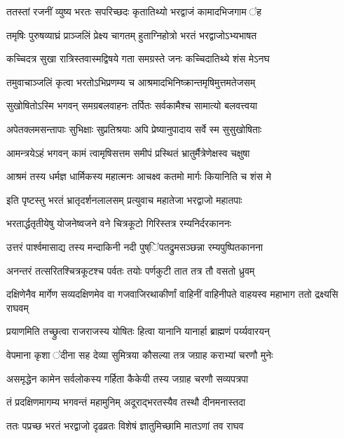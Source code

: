 
\twolineshloka
{ततस्तां रजनीं व्युष्य भरतः सपरिच्छदः}
{कृतातिथ्यो भरद्वाजं कामादभिजगाम ऺह} %

\twolineshloka
{तमृषिः पुरुषव्याघ्रं प्राञ्जलिं प्रेक्ष्य चागतम्}
{हुताग्निहोत्रो भरतं भरद्वाजोऽभ्यभाषत} %

\twolineshloka
{कच्चिदत्र सुखा रात्रिस्तवास्मद्विषये गता}
{समग्रस्ते जनः कच्चिदातिथ्ये शंस मेऽनघ} %

\twolineshloka
{तमुवाचाञ्जलिं कृत्वा भरतोऽभिप्रणम्य च}
{आश्रमादभिनिष्क्रान्तमृषिमुत्तमतेजसम्} %

\twolineshloka
{सुखोषितोऽस्मि भगवन् समग्रबलवाहनः}
{तर्पितः सर्वकामैश्च सामात्यो बलवत्त्वया} %

\twolineshloka
{अपेतक्लमसन्तापाः सुभिक्षाः सुप्रतिश्रयाः}
{अपि प्रेष्यानुपादाय सर्वे स्म सुसुखोषिताः} %

\twolineshloka
{आमन्त्रयेऽहं भगवन् कामं त्वामृषिसत्तम}
{समीपं प्रस्थितं भ्रातुर्मैत्रेणेक्षस्व चक्षुषा} %

\twolineshloka
{आश्रमं तस्य धर्मज्ञ धार्मिकस्य महात्मनः}
{आचक्ष्व कतमो मार्गः कियानिति च शंस मे} %

\twolineshloka
{इति पृष्टस्तु भरतं भ्रातृदर्शनलालसम्}
{प्रत्युवाच महातेजा भरद्वाजो महातपाः} %

\twolineshloka
{भरतार्द्धतृतीयेषु योजनेष्वजने वने}
{चित्रकूटो गिरिस्तत्र रम्यनिर्दरकाननः} %

\twolineshloka
{उत्तरं पार्श्वमासाद्य तस्य मन्दाकिनी नदी}
{पुष्ऺिपतद्रुमसञ्छन्ना रम्यपुष्पितकानना} %

\twolineshloka
{अनन्तरं तत्सरितश्चित्रकूटश्च पर्वतः}
{तयोः पर्णकुटी तात तत्र तौ वसतो ध्रुवम्} %

\threelineshloka
{दक्षिणेनैव मार्गेण सव्यदक्षिणमेव वा}
{गजवाजिरथाकीर्णां वाहिनीं वाहिनीपते}
{वाहयस्व महाभाग ततो द्रक्ष्यसि राघवम्} %

\twolineshloka
{प्रयाणमिति तच्छ्रुत्वा राजराजस्य योषितः}
{हित्वा यानानि यानार्हा ब्राह्मणं पर्य्यवारयन्} %

\twolineshloka
{वेपमाना कृशा ऺदीना सह देव्या सुमित्रया}
{कौसल्या तत्र जग्राह कराभ्यां चरणौ मुनेः} %

\twolineshloka
{असमृद्धेन कामेन सर्वलोकस्य गर्हिता}
{कैकेयी तस्य जग्राह चरणौ सव्यपत्रपा} %

\twolineshloka
{तं प्रदक्षिणमागम्य भगवन्तं महामुनिम्}
{अदूराद्भरतस्यैव तस्थौ दीनमनास्तदा} %

\twolineshloka
{ततः पप्रच्छ भरतं भरद्वाजो दृढव्रतः}
{विशेषं ज्ञातुमिच्छामि मातऽणां तव राघव} %


